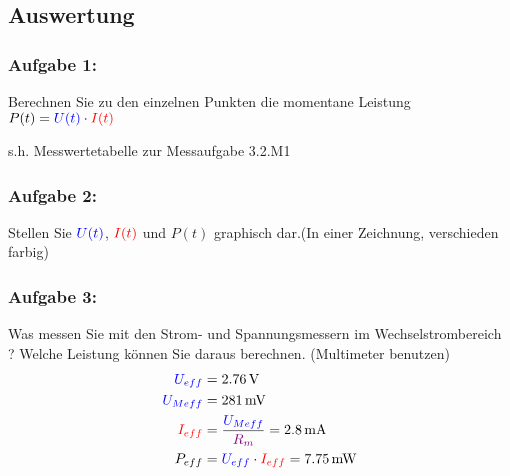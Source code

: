 \documentclass[11pt,a4paper,titlepage]{scrreprt}
\begin{document}
            
            \subsection{Auswertung}
                \subsubsection{Aufgabe 1:}  Berechnen Sie zu den einzelnen Punkten die momentane Leistung $P(t) = \textcolor{blue}{U(t)} \cdot \textcolor{red}{I(t)}$ 
                    
                    s.h. Messwertetabelle zur Messaufgabe 3.2.M1
                    \pagebreak
                \subsubsection{Aufgabe 2:}   Stellen Sie $\textcolor{blue}{U(t)}$, $\textcolor{red}{I(t)}$ und $P(t)$ graphisch dar.(In einer Zeichnung, verschieden farbig)
                
                
                \subsubsection{Aufgabe 3:}  Was messen Sie mit den Strom- und Spannungsmessern im Wechselstrombereich ? Welche Leistung können Sie daraus berechnen. (Multimeter benutzen)
                \begin{align*}
                \textcolor{blue}{U_{eff}} &= \SI{2,76}{\volt}\\
                \textcolor{blue}{U_{Meff}} &= \SI{281}{\milli\volt}\\
                \textcolor{red}{I_{eff}} &= \frac{\textcolor{blue}{U_{Meff}}}{\textcolor{violet}{R_m}} = \SI{2,8}{\milli\ampere}\\
                P_{eff} &=  \textcolor{blue}{U_{eff}} \cdot \textcolor{red}{I_{eff}} = \SI{7,75}{\milli\watt}
                \end{align*}
     			\pagebreak
\end{document}
